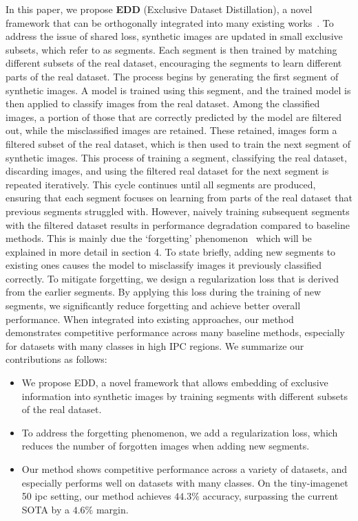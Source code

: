 \documentclass{article}
\theoremstyle{plain}
\theoremstyle{definition}
\theoremstyle{remark}
\begin{document}
In this paper, we propose \textbf{EDD} (Exclusive Dataset Distillation), a novel framework that can be orthogonally integrated into many existing works~\cite{}.
To address the issue of shared loss, synthetic images are updated in small exclusive subsets, which refer to as segments.
Each segment is then trained by matching different subsets of the real dataset, encouraging the segments to learn different parts of the real dataset.
The process begins by generating the first segment of synthetic images. A model is trained using this segment, and the trained model is then applied to classify images from the real dataset. Among the classified images, a portion of those that are correctly predicted by the model are filtered out, while the misclassified images are retained. These retained, images form a filtered subset of the real dataset, which is then used to train the next segment of synthetic images.
This process of training a segment, classifying the real dataset, discarding images, and using the filtered real dataset for the next segment is repeated iteratively. This cycle continues until all segments are produced, ensuring that each segment focuses on learning from parts of the real dataset that previous segments struggled with.
However, naively training subsequent segments with the filtered dataset results in performance degradation compared to baseline methods.
This is mainly due the `forgetting' phenomenon~\cite{} which will be explained in more detail in section 4.
To state briefly, adding new segments to existing ones causes the model to misclassify images it previously classified correctly.
To mitigate forgetting, we design a regularization loss that is derived from the earlier segments.
By applying this loss during the training of new segments, we significantly reduce forgetting and achieve better overall performance.
When integrated into existing approaches, our method demonstrates competitive performance across many baseline methods, especially for datasets with many classes in high IPC regions.
We summarize our contributions as follows:
\begin{itemize}
    \item We propose EDD, a novel framework that allows embedding of exclusive information into synthetic images by training segments with different subsets of the real dataset.
    \item To address the forgetting phenomenon, we add a regularization loss, which reduces the number of forgotten images when adding new segments.
    \item Our method shows competitive performance across a variety of datasets, and especially performs well on datasets with many classes. On the tiny-imagenet 50 ipc setting, our method achieves $44.3\%$ accuracy, surpassing the current SOTA by a $4.6\%$ margin.
\end{itemize}
\end{document}
